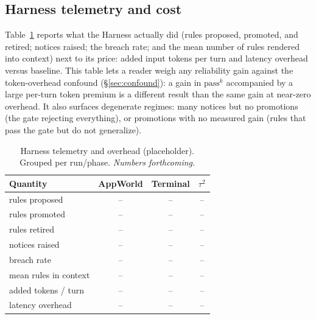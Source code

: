 \documentclass[letterpaper]{article} %
\newcommand{\passk}{\mathrm{pass}^{k}}
\newcommand{\TBD}{--}                             %
\begin{document}
\subsection{Harness telemetry and cost}
\label{sec:telemetry}
Table~\ref{tab:telemetry} reports what the Harness actually did (rules proposed, promoted, and
retired; notices raised; the breach rate; and the mean number of rules rendered into
context) next to its price: added input tokens per turn and latency overhead versus baseline.
This table lets a reader weigh any reliability gain against the token-overhead confound
(\S\ref{sec:confound}): a gain in $\passk$ accompanied by a large per-turn token premium is a
different result than the same gain at near-zero overhead. It also surfaces degenerate
regimes: many notices but no promotions (the gate rejecting everything), or promotions with no
measured gain (rules that pass the gate but do not generalize).

\begin{table}[t]
\centering\small
\caption{Harness telemetry and overhead (placeholder). Grouped per run/phase.
\emph{Numbers forthcoming.}}
\label{tab:telemetry}
\begin{tabular}{@{}lccc@{}}
\toprule
Quantity & AppWorld & Terminal & $\tau^2$ \\
\midrule
rules proposed        & \TBD & \TBD & \TBD \\
rules promoted        & \TBD & \TBD & \TBD \\
rules retired         & \TBD & \TBD & \TBD \\
notices raised        & \TBD & \TBD & \TBD \\
breach rate           & \TBD & \TBD & \TBD \\
mean rules in context & \TBD & \TBD & \TBD \\
added tokens / turn   & \TBD & \TBD & \TBD \\
latency overhead      & \TBD & \TBD & \TBD \\
\bottomrule
\end{tabular}
\end{table}
\end{document}
